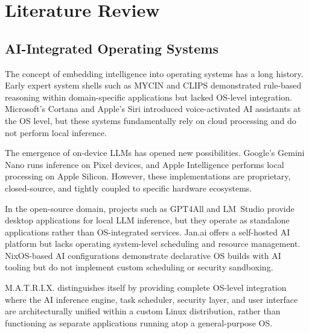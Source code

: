 \documentclass[conference]{IEEEtran}
\begin{document}

\section{Literature Review}
\label{sec:literature}

\subsection{AI-Integrated Operating Systems}

The concept of embedding intelligence into operating systems has a long history. Early expert system shells such as MYCIN \cite{shortliffe1976mycin} and CLIPS \cite{giarratano2005expert} demonstrated rule-based reasoning within domain-specific applications but lacked OS-level integration. Microsoft's Cortana \cite{microsoft2020cortana} and Apple's Siri \cite{apple2024siri} introduced voice-activated AI assistants at the OS level, but these systems fundamentally rely on cloud processing and do not perform local inference.

The emergence of on-device LLMs has opened new possibilities. Google's Gemini Nano \cite{google2024gemini} runs inference on Pixel devices, and Apple Intelligence \cite{apple2024intelligence} performs local processing on Apple Silicon. However, these implementations are proprietary, closed-source, and tightly coupled to specific hardware ecosystems.

In the open-source domain, projects such as GPT4All \cite{gpt4all2024} and LM~Studio \cite{lmstudio2024} provide desktop applications for local LLM inference, but they operate as standalone applications rather than OS-integrated services. Jan.ai \cite{jan2024} offers a self-hosted AI platform but lacks operating system-level scheduling and resource management. NixOS-based AI configurations \cite{nixos2024} demonstrate declarative OS builds with AI tooling but do not implement custom scheduling or security sandboxing.

M.A.T.R.I.X. distinguishes itself by providing complete OS-level integration where the AI inference engine, task scheduler, security layer, and user interface are architecturally unified within a custom Linux distribution, rather than functioning as separate applications running atop a general-purpose OS.
\end{document}
